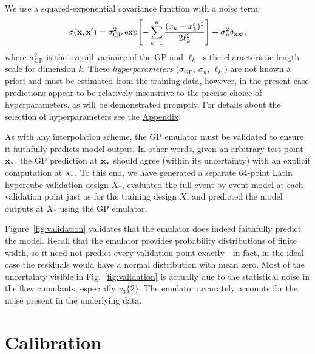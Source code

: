 \documentclass[aps,prc,reprint,superscriptaddress,amsmath]{revtex4-1}
\newcommand{\vnk}[2]{v_#1\{#2\}}
\begin{document}
We use a squared-exponential covariance function with a noise term:
\begin{equation}
  \sigma(\mathbf x, \mathbf x') = \sigma_\text{GP}^2 \exp\Biggl[ -\sum_{k=1}^n \frac{(x_k - x'_k)^2}{2\ell_k^2} \Biggr] + \sigma_n^2\delta_{\mathbf x\mathbf x'},
  \label{eq:full_cov}
\end{equation}
where $\sigma_\text{GP}^2$ is the overall variance of the GP and $\ell_k$ is the characteristic length scale for dimension $k$.
These \emph{hyperparameters} $(\sigma_\text{GP}$, $\sigma_n$, $\ell_k)$ are not known a priori and must be estimated from the training data, however, in the present case predictions appear to be relatively insensitive to the precise choice of hyperparameters, as will be demonstrated promptly.
For details about the selection of hyperparameters see the \hyperref[app:train]{Appendix}.

As with any interpolation scheme, the GP emulator must be validated to ensure it faithfully predicts model output.
In other words, given an arbitrary test point $\mathbf x_*$, the GP prediction at $\mathbf x_*$ should agree (within its uncertainty) with an explicit computation at $\mathbf x_*$.
To this end, we have generated a separate 64-point Latin hypercube validation design $X_*$, evaluated the full event-by-event model at each validation point just as for the training design $X$, and predicted the model outputs at $X_*$ using the GP emulator.

Figure~\ref{fig:validation} validates that the emulator does indeed faithfully predict the model.
Recall that the emulator provides probability distributions of finite width, so it need not predict every validation point exactly---in fact, in the ideal case the residuals would have a normal distribution with mean zero.
Most of the uncertainty visible in Fig.~\ref{fig:validation} is actually due to the statistical noise in the flow cumulants, especially $\vnk 3 2$.
The emulator accurately accounts for the noise present in the underlying data.


\section{Calibration}

\newcommand{\z}{\mathbf z}
\newcommand{\xs}{\x_\star}
\newcommand{\zs}{\z_\star}
\newcommand{\yexp}{\y_\text{exp}}
\newcommand{\zexp}{\z_\text{exp}}
\end{document}
